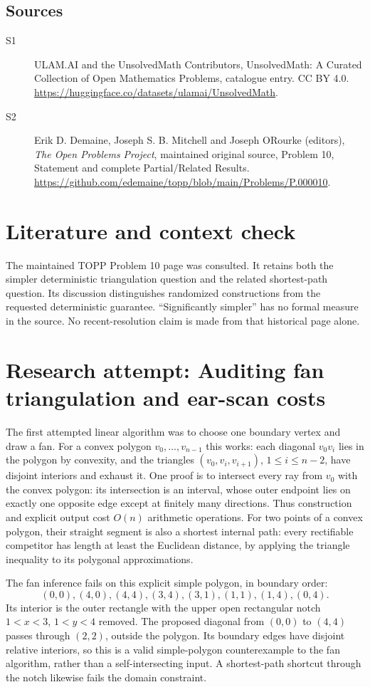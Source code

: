 \documentclass[11pt]{article}
\begin{document}
\subsection{Sources}
\begin{description}
\item[S1] ULAM.AI and the UnsolvedMath Contributors, UnsolvedMath: A Curated Collection of Open Mathematics Problems, catalogue entry. CC BY 4.0. \url{https://huggingface.co/datasets/ulamai/UnsolvedMath}.
\item[S2] Erik D. Demaine, Joseph S. B. Mitchell and Joseph O\textquotesingle Rourke (editors), \emph{The Open Problems Project}, maintained original source, Problem 10, Statement and complete Partial/Related Results. \url{https://github.com/edemaine/topp/blob/main/Problems/P.000010}.
\end{description}
\label{end:statement}

\section{Literature and context check}
The maintained TOPP Problem 10 page was consulted. It retains both the
simpler deterministic triangulation question and the related shortest-path
question. Its discussion distinguishes randomized constructions from the requested
deterministic guarantee. ``Significantly simpler'' has no formal measure in the
source. No recent-resolution claim is made from that historical page alone.
\section{Research attempt: Auditing fan triangulation and ear-scan costs}
The first attempted linear algorithm was to choose one boundary vertex and
draw a fan. For a convex polygon $v_0,\ldots,v_{n-1}$ this works: each diagonal
$v_0v_i$ lies in the polygon by convexity, and the triangles
$(v_0,v_i,v_{i+1})$, $1\le i\le n-2$, have disjoint interiors and exhaust it.
One proof is to intersect every ray from $v_0$ with the convex polygon: its
intersection is an interval, whose outer endpoint lies on exactly one opposite
edge except at finitely many directions. Thus construction and explicit output
cost $O(n)$ arithmetic operations. For two points of a convex polygon, their
straight segment is also a shortest internal path: every rectifiable competitor
has length at least the Euclidean distance, by applying the triangle inequality
to its polygonal approximations.

The fan inference fails on this explicit simple polygon, in boundary order:
\[
 (0,0),(4,0),(4,4),(3,4),(3,1),(1,1),(1,4),(0,4).
\]
Its interior is the outer rectangle with the upper open rectangular notch
$1<x<3$, $1<y<4$ removed. The proposed diagonal from $(0,0)$ to $(4,4)$
passes through $(2,2)$, outside the polygon. Its boundary edges have disjoint
relative interiors, so this is a valid simple-polygon counterexample to the fan
algorithm, rather than a self-intersecting input. A shortest-path shortcut through
the notch likewise fails the domain constraint.
\end{document}
